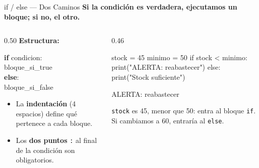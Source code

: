 \documentclass[aspectratio=169, 11pt]{beamer}
\begin{document}
\begin{frame}[fragile,shrink=30]{if / else — Dos Caminos}
  \vspace{-6pt}
  {\small\color{arcaDark}\bfseries
    Si la condición es verdadera, ejecutamos un bloque;
    si no, el otro.}

  \vspace{4pt}
  \begin{columns}[T]
    \begin{column}{0.50\textwidth}
      {\footnotesize\color{arcaDark}\bfseries Estructura:}
      \vspace{2pt}
      \begin{tcolorbox}[
        colback=arcaGray, colframe=arcaRed, boxrule=0pt, leftrule=3pt,
        arc=2pt, left=5pt, right=5pt, top=3pt, bottom=3pt
      ]
        {\scriptsize\ttfamily\color{textDark}
          \textbf{\color{arcaRed}if} condicion:\\ \hspace*{12pt}bloque\_si\_true\\
          \textbf{\color{arcaRed}else}:\\ \hspace*{12pt}bloque\_si\_false
        }
      \end{tcolorbox}

      \vspace{4pt}
      {\scriptsize\color{textMuted}
      \begin{itemize}\setlength{\itemsep}{2pt}
        \item[{\color{arcaRed}\scriptsize\faIndent}]
          La \textbf{indentación} (4 espacios) define
          qué pertenece a cada bloque.
        \item[{\color{arcaRed}\scriptsize\textbf{:}}]
          Los \textbf{dos puntos} \texttt{:} al final
          de la condición son obligatorios.
      \end{itemize}
      }
    \end{column}

    \begin{column}{0.46\textwidth}
      \begin{pyblock}
stock = 45
minimo = 50
if stock < minimo:
    print("ALERTA: reabastecer")
else:
    print("Stock suficiente")
      \end{pyblock}
      \vspace{-2pt}
      \begin{outputblock}
ALERTA: reabastecer
      \end{outputblock}

      \vspace{6pt}
      {\scriptsize\color{textMuted}
        \faArrowRight\hspace{4pt}
        \texttt{stock} es 45, menor que 50: entra al bloque \texttt{if}.
        Si cambiamos a 60, entraría al \texttt{else}.}
    \end{column}
  \end{columns}
\end{frame}
\end{document}
